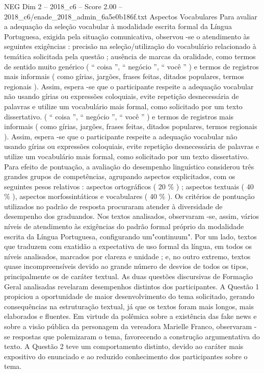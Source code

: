 \begin{textsample}{NEG Dim 2 – 2018\_c6 – Score 2.00 – 2018\_c6/enade\_2018\_admin\_6a5e0b186f.txt}
Aspectos Vocabulares Para avaliar a adequação da seleção vocabular à modalidade escrita formal da Língua Portuguesa, exigida pela situação comunicativa, observou -se o atendimento às seguintes exigências : precisão na seleção/utilização do vocabulário relacionado à temática solicitada pela questão ; ausência de marcas da oralidade, como termos de sentido muito genérico ( “ coisa ”, “ negócio ”, “ você ” ) e termos de registros mais informais ( como gírias, jargões, frases feitas, ditados populares, termos regionais ).
Assim, espera -se que o participante respeite a adequação vocabular não usando gírias ou expressões coloquiais, evite repetição desnecessária de palavras e utilize um vocabulário mais formal, como solicitado por um texto dissertativo. ( “ coisa ”, “ negócio ”, “ você ” ) e termos de registros mais informais ( como gírias, jargões, frases feitas, ditados populares, termos regionais ).
Assim, espera -se que o participante respeite a adequação vocabular não usando gírias ou expressões coloquiais, evite repetição desnecessária de palavras e utilize um vocabulário mais formal, como solicitado por um texto dissertativo.
Para efeito de pontuação, a avaliação do desempenho linguístico considerou três grandes grupos de competências, agrupando aspectos explicitados, com os seguintes pesos relativos : aspectos ortográficos ( 20 \% ) ; aspectos textuais ( 40 \% ), aspectos morfossintáticos e vocabulares ( 40 \% ).
Os critérios de pontuação utilizados no padrão de resposta procuraram atender à diversidade de desempenho dos graduandos.
Nos textos analisados, observaram -se, assim, vários níveis de atendimento às exigências do padrão formal próprio da modalidade escrita da Língua Portuguesa, configurando um"continuum".
Por um lado, textos que traduzem com exatidão a expectativa de uso formal da língua, em todos os níveis analisados, marcados por clareza e unidade ; e, no outro extremo, textos quase incompreensíveis devido ao grande número de desvios de todos os tipos, principalmente os de caráter textual.
As duas questões discursivas de Formação Geral analisadas revelaram desempenhos distintos dos participantes.
A Questão 1 propiciou a oportunidade de maior desenvolvimento do tema solicitado, gerando consequências na estruturação textual, já que os textos foram mais longos, mais elaborados e fluentes.
Em virtude da polêmica sobre a existência das fake news e sobre a visão pública da personagem da vereadora Marielle Franco, observaram -se respostas que polemizaram o tema, favorecendo a construção argumentativa do texto.
A Questão 2 teve um comportamento distinto, devido ao caráter mais expositivo do enunciado e ao reduzido conhecimento dos participantes sobre o tema.

\end{textsample}
